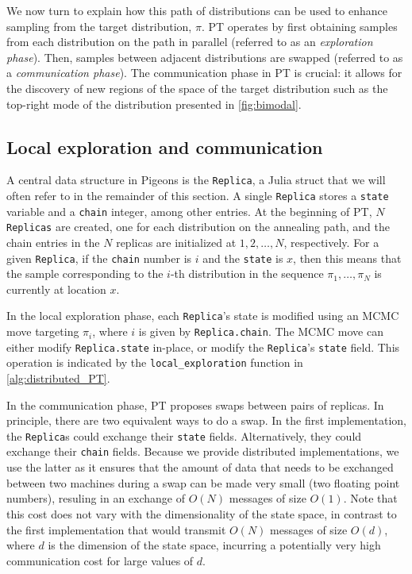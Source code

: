We now turn to explain how this path of distributions can be used to enhance 
sampling from the target distribution, $\pi$. 
PT operates by first obtaining samples from each distribution on the path in parallel 
(referred to as an \textit{exploration phase}). 
Then, samples between adjacent distributions are swapped (referred to as 
a \textit{communication phase}). The communication phase in PT is crucial: it allows 
for the discovery of new regions of the space of the target distribution such as 
the top-right mode of the distribution presented in \cref{fig:bimodal}. 




\subsection{Local exploration and communication}
A central data structure in Pigeons is the \texttt{Replica}, a Julia struct 
that we will often refer to in the remainder of this section. 
A single \texttt{Replica} stores a \texttt{state} variable and a \texttt{chain} 
integer, among other entries. 
At the beginning of PT, $N$ \texttt{Replicas} are created, 
one for each distribution on the annealing path, and 
the chain entries in the $N$ replicas are initialized at $1,2,\ldots,N$, respectively. 
For a given \texttt{Replica}, if the \texttt{chain} number is $i$ and the \texttt{state}
is $x$, then this means that the sample corresponding to the $i$-th distribution in 
the sequence $\pi_1, \ldots, \pi_N$ is currently at location $x$.  

 
In the local exploration phase,
each \texttt{Replica}'s state is modified using an MCMC move targeting $\pi_i$,
where $i$ is given by \texttt{Replica.chain}.
The MCMC move can either modify \texttt{Replica.state} in-place, or modify the 
\texttt{Replica}'s \texttt{state} field. 
This operation is indicated by the \texttt{local\_exploration} function in 
\cref{alg:distributed_PT}.

 
In the communication phase, PT proposes swaps between pairs of replicas. 
In principle, there are two equivalent ways to do a swap.
In the first implementation, the \texttt{Replica}s 
could exchange their \texttt{state} fields.
Alternatively, they could exchange their \texttt{chain} fields.
Because we provide distributed implementations, we use the latter as it ensures that 
the amount of data that needs to be exchanged between two machines during a swap 
can be made very small (two floating point numbers), resuling in 
an exchange of $O(N)$ messages of size $O(1)$. 
Note that this cost does not vary with the dimensionality of the state space, 
in contrast to the first implementation that would transmit 
$O(N)$ messages of size $O(d)$, where $d$ is the dimension of the state space,
incurring a potentially very high communication cost for large values of $d$.

